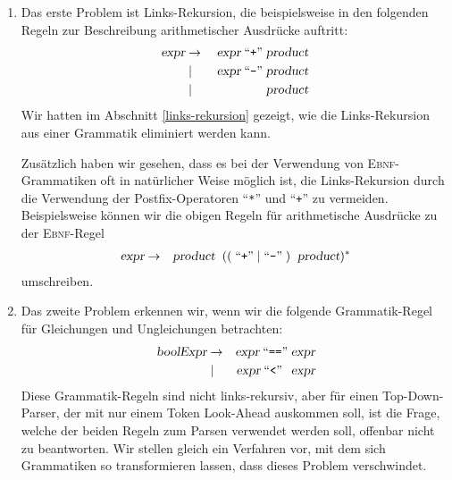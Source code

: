\begin{enumerate}
\item Das erste Problem ist Links-Rekursion, die beispielsweise in den folgenden
      Regeln zur Beschreibung arithmetischer Ausdrücke auftritt:
      \begin{eqnarray*}
        \textsl{expr}    & \rightarrow & \;\textsl{expr} \;\mbox{``\texttt{+}''}\; \textsl{product}  \\
                         & \mid        & \;\textsl{expr} \;\mbox{``\texttt{-}''}\; \textsl{product}  \\
                         & \mid        & \;\textsl{product}                           
      \end{eqnarray*}
      Wir hatten im Abschnitt \ref{links-rekursion} gezeigt, wie die Links-Rekursion aus
      einer Grammatik eliminiert werden kann. 
      
      Zusätzlich haben wir gesehen, dass es bei der Verwendung von \textsc{Ebnf}-Grammatiken 
      oft in natürlicher Weise möglich ist, die Links-Rekursion durch die Verwendung der
      Postfix-Operatoren ``\texttt{*}'' und ``\texttt{+}'' zu vermeiden.  Beispielsweise
      können wir die obigen Regeln für arithmetische Ausdrücke zu der \textsc{Ebnf}-Regel
      \begin{eqnarray*} 
        \textsl{expr}    & \rightarrow & \textsl{product}\;\; ((\;\mbox{``\texttt{+}''}\;|\;\mbox{``\texttt{-}''}\;) \;\;\textsl{product})^* 
      \end{eqnarray*}
      umschreiben.
\item Das zweite Problem erkennen wir, wenn wir die folgende Grammatik-Regel für 
      Gleichungen und Ungleichungen betrachten:
      \begin{eqnarray*}
        \textsl{boolExpr} & \rightarrow & \textsl{expr} \;\mbox{``\texttt{==}''}\;    \textsl{expr} \\
                          & \mid        & \textsl{expr} \;\mbox{``\texttt{<}''}\;\;\, \textsl{expr} 
      \end{eqnarray*}
      Diese Grammatik-Regeln sind nicht links-rekursiv, aber
      für einen Top-Down-Parser, der mit nur einem Token Look-Ahead
      auskommen soll, ist die Frage, welche der beiden Regeln zum Parsen verwendet
      werden soll, offenbar nicht zu beantworten.  Wir stellen gleich ein Verfahren vor, mit dem sich
      Grammatiken so transformieren lassen, dass dieses Problem verschwindet.
\end{enumerate}

